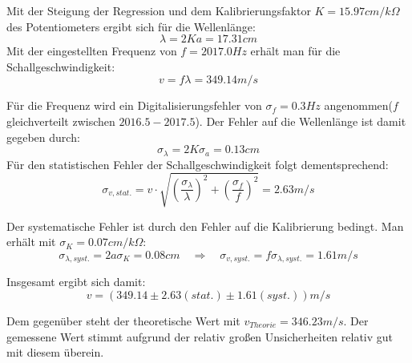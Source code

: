 \documentclass[12pt,a4paper]{article}
\begin{document}
Mit der Steigung der Regression und dem Kalibrierungsfaktor $K=15.97 cm/k\Omega$ des Potentiometers ergibt sich für die Wellenlänge:
\begin{equation}
\lambda=2Ka=17.31cm
\end{equation}
Mit der eingestellten Frequenz von $f=2017.0Hz$ erhält man für die Schallgeschwindigkeit:
\begin{equation}
v=f \lambda = 349.14m/s
\end{equation}

Für die Frequenz wird ein Digitalisierungsfehler von $\sigma_f=0.3Hz$ angenommen($f$ gleichverteilt zwischen $2016.5-2017.5$). Der Fehler auf die Wellenlänge ist damit gegeben durch:
\begin{equation}
\sigma_{\lambda}=2K \sigma_a=0.13cm
\end{equation}
Für den statistischen Fehler der Schallgeschwindigkeit folgt dementsprechend:
\begin{equation}
\sigma_{v,stat.}=v \cdot \sqrt{(\frac{\sigma_{\lambda}}{\lambda})^2+(\frac{\sigma_f}{f})^2}=2.63m/s
\end{equation}

Der systematische Fehler ist durch den Fehler auf die Kalibrierung bedingt. Man erhält mit $\sigma_K=0.07cm/k\Omega$:
\begin{equation}
\sigma_{\lambda,syst.}=2a \sigma_K=0.08cm \quad \Rightarrow \quad \sigma_{v,syst.}=f \sigma_{\lambda,syst.}=1.61m/s
\end{equation}

Insgesamt ergibt sich damit:
\begin{equation}
v=(349.14 \pm 2.63(stat.) \pm 1.61(syst.))m/s
\end{equation}

Dem gegenüber steht der theoretische Wert mit $v_{Theorie}=346.23m/s$. Der gemessene Wert stimmt aufgrund der relativ großen Unsicherheiten relativ gut mit diesem überein.
\end{document}
